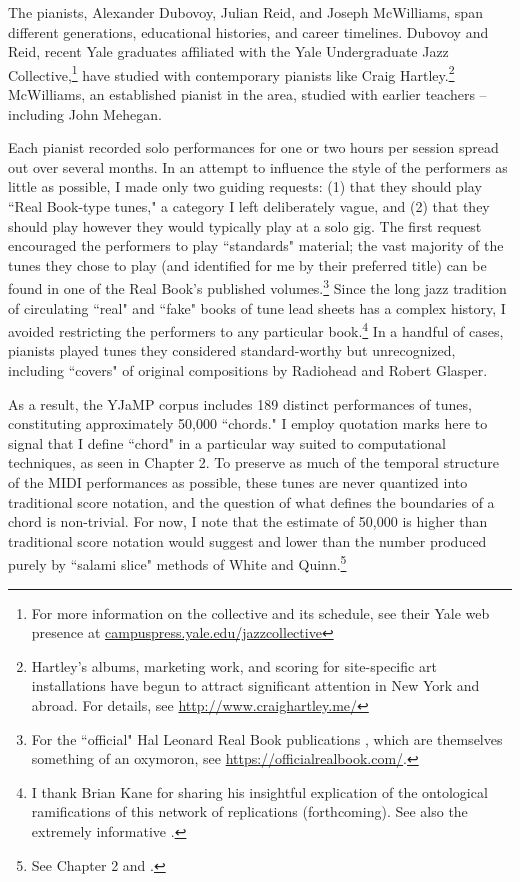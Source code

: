 The pianists, Alexander Dubovoy, Julian Reid, and Joseph McWilliams, span different generations, educational histories, and career timelines.  Dubovoy and Reid, recent Yale graduates affiliated with the Yale Undergraduate Jazz Collective,\footnote{For more information on the collective and its schedule, see their Yale web presence at \href{http://campuspress.yale.edu/jazzcollective/}{campuspress.yale.edu/jazzcollective}} have studied with contemporary pianists like Craig Hartley.\footnote{Hartley's albums, marketing work, and scoring for site-specific art installations have begun to attract significant attention in New York and abroad.  For details, see \href{http://www.craighartley.me/}{http://www.craighartley.me/}}  McWilliams, an established pianist in the area, studied with earlier teachers -- including John Mehegan.

Each pianist recorded solo performances for one or two hours per session spread out over several months.  In an attempt to influence the style of the performers as little as possible, I made only two guiding requests: (1) that they should play ``Real Book-type tunes," a category I left deliberately vague, and (2) that they should play however they would typically play at a solo gig.  The first request encouraged the performers to play ``standards" material; the vast majority of the tunes they chose to play (and identified for me by their preferred title) can be found in one of the Real Book's published volumes.\footnote{For the ``official" Hal Leonard Real Book publications \cite{realbook}, which are themselves something of an oxymoron, see \href{https://officialrealbook.com/}{https://officialrealbook.com/}.}  Since the long jazz tradition of circulating ``real" and ``fake" books of tune lead sheets has a complex history, I avoided restricting the performers to any particular book.\footnote{I thank Brian Kane for sharing his insightful explication of the ontological ramifications of this network of replications (forthcoming).  See also the extremely informative \cite{kernfeld2006}.}  In a handful of cases, pianists played tunes they considered standard-worthy but unrecognized, including ``covers" of original compositions by Radiohead and Robert Glasper.

As a result, the YJaMP corpus includes 189 distinct performances of tunes, constituting approximately 50,000 ``chords."  I employ quotation marks here to signal that I define ``chord" in a particular way suited to computational techniques, as seen in Chapter 2.  To preserve as much of the temporal structure of the MIDI performances as possible, these tunes are never quantized into traditional score notation, and the question of what defines the boundaries of a chord is non-trivial.  For now, I note that the estimate of 50,000 is higher than traditional score notation would suggest and lower than the number produced purely by ``salami slice" methods of White and Quinn.\footnote{See Chapter 2 and \cite{wq2017}.}

